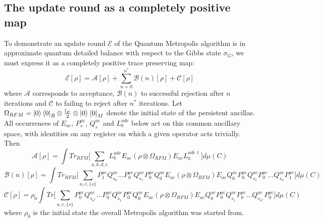 \documentclass[aps,floatfix,10pt,amssymb,amsfont,amsmath,superscriptaddress,float,nofootinbib,longbibliography,nobalancelastpage,twocolumn]{revtex4-2}
\begin{document}
\subsection{The update round as a completely positive map}
\label{subsec:cptp}
\begin{widetext}
To demonstrate an update round $\mathcal{E}$ of the Quantum Metropolis algorithm is in approximate quantum detailed balance with respect to the Gibbs state $\sigma_G$, we must express it as a completely positive trace preserving map:
\begin{equation}
    \mathcal{E}[\rho] = \mathcal{A}[\rho] + \sum_{n=0}^{n^*} \mathcal{B}(n)[\rho] + \mathcal{C}[\rho]
\end{equation}
where $\mathcal{A}$ corresponds to acceptance, $\mathcal{B}(n)$ to successful rejection after $n$ iterations and $\mathcal{C}$ to failing to reject after $n^*$ iterations. Let $\Omega_{RFM} =\ket{0}\bra{0}_R\otimes \frac{\mathbb{I}_F}{2}\otimes\ket{0}\bra{0}_M$ denote the initial state of the persistent ancillas. All occurrences of $E_{ae}$, $P_s^{ae}$, $Q_s^{ae}$ and $L_b^{ade}$ below act on this common ancillary space, with identities on any register on which a given operator acts trivially. Then
\begin{equation}
    \mathcal{A}[\rho] = \int  Tr_{RFM}\bigg[\sum_{a,b,d,e}L_b^{ade} E_{ae} ( \rho\otimes \Omega_{RFM}) 
     E_{ae}L^{ade\dagger}_b\bigg]d\mu(C)
\end{equation}
\begin{equation}
    \mathcal{B}(n)[\rho] = \int Tr_{RFM}\bigg[\sum_{a,e,\{s\}}P^{ae}_1Q^{ae}_{s_n}\ldots P^{ae}_0Q^{ae}_{s_1}P^{ae}_0Q^{ae}_0E_{ae} ( \rho\otimes \Omega_{RFM})E_{ae}Q^{ae}_0P^{ae}_0Q^{ae}_{s_1}P^{ae}_0\ldots Q^{ae}_{s_n}P^{ae}_1\bigg]d\mu(C)
\end{equation}
\begin{equation}
    \mathcal{C}[\rho] = \rho_0 \int Tr\bigg[\sum_{a,e,\{s\}}P^{ae}_0Q^{ae}_{s_{n^*}}\ldots P^{ae}_0Q^{ae}_{s_1}P^{ae}_0Q^{ae}_0E_{ae} ( \rho\otimes \Omega_{RFM})E_{ae}Q^{ae}_0P^{ae}_0Q^{ae}_{s_1}P^{ae}_0\ldots Q^{ae}_{s_{n^*}}P^{ae}_0\bigg]d\mu(C) 
\end{equation}
where $\rho_0$ is the initial state the overall Metropolis algorithm was started from. 

\end{widetext}
\end{document}
